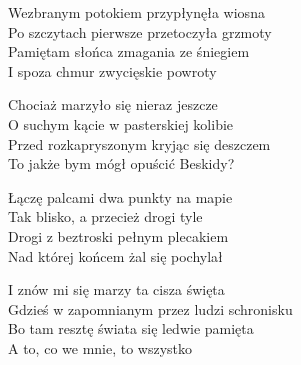 \begin{text}
\begin{scriptTwelve}
Wezbranym potokiem przypłynęła wiosna\\
Po szczytach pierwsze przetoczyła grzmoty\\
Pamiętam słońca zmagania ze śniegiem\\
I spoza chmur zwycięskie powroty

Chociaż marzyło się nieraz jeszcze\\
O suchym kącie w pasterskiej kolibie\\
Przed rozkapryszonym kryjąc się deszczem\\
To jakże bym mógł opuścić Beskidy?

Łączę palcami dwa punkty na mapie\\
Tak blisko, a przecież drogi tyle\\
Drogi z beztroski pełnym plecakiem\\
Nad której końcem żal się pochylał

I znów mi się marzy ta cisza święta\\
Gdzieś w zapomnianym przez ludzi schronisku\\
Bo tam resztę świata się ledwie pamięta\\
A to, co we mnie, to wszystko
\end{scriptTwelve}
\end{text}
\begin{chord}
\end{chord}